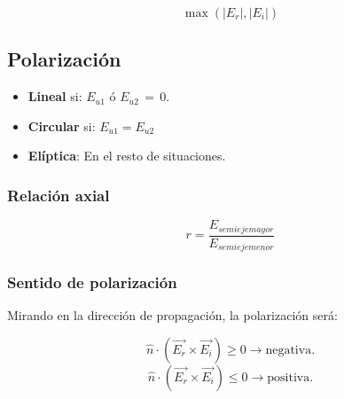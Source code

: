 \documentclass[12pt,a4paper]{article}
\begin{document}
\[ \max{\left(|E_r|, |E_i|\right)} \]

\subsection{Polarización}
\label{sub:polarizacion}

\begin{itemize}
		\item \textbf{Lineal} si:
				$ E_{u1} $ ó $ E_{u2} \, = \, 0$.
		\item \textbf{Circular} si:
				$ E_{u1} = E_{u2} $ 
		\item \textbf{Elíptica}:
				En el resto de situaciones.
\end{itemize}

\subsubsection{Relación axial}
\label{ssub:relacion_axial}

\[ r = \frac{E_{semieje mayor}}{E_{semieje menor}} \] 

\subsubsection{Sentido de polarización}
\label{ssub:sentido_de_polarizacion}

Mirando en la dirección de propagación, la polarización será:

\[ \hat{n} \cdot \left( \vec{E_r} \times \vec{E_i} \right) \geq 0
\rightarrow \mbox{negativa}. \]
\[ \hat{n} \cdot \left( \vec{E_r} \times \vec{E_i} \right) \leq 0
\rightarrow \mbox{positiva}. \]
\end{document}
